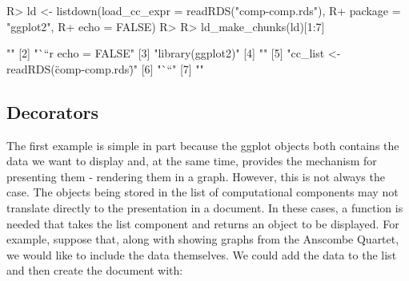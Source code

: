\documentclass[
]{jss}
\begin{document}
\begin{CodeChunk}

\begin{CodeInput}
R> ld <- listdown(load_cc_expr = readRDS("comp-comp.rds"), 
R+                package = "ggplot2",
R+                echo = FALSE)
R> 
R> ld_make_chunks(ld)[1:7]
\end{CodeInput}

\begin{CodeOutput}
[1] ""                                     
[2] "```{r echo = FALSE}"                  
[3] "library(ggplot2)"                     
[4] ""                                     
[5] "cc_list <- readRDS(\"comp-comp.rds\")"
[6] "```"                                  
[7] ""                                     
\end{CodeOutput}
\end{CodeChunk}

\hypertarget{decorators}{%
\subsection{Decorators}\label{decorators}}

The first example is simple in part because the ggplot objects both
contains the data we want to display and, at the same time, provides the
mechanism for presenting them - rendering them in a graph. However, this
is not always the case. The objects being stored in the list of
computational components may not translate directly to the presentation
in a document. In these cases, a function is needed that takes the list
component and returns an object to be displayed. For example, suppose
that, along with showing graphs from the Anscombe Quartet, we would like
to include the data themselves. We could add the data to the
 list and then create the document with:

\begin{CodeChunk}


\end{CodeChunk}
\end{document}
